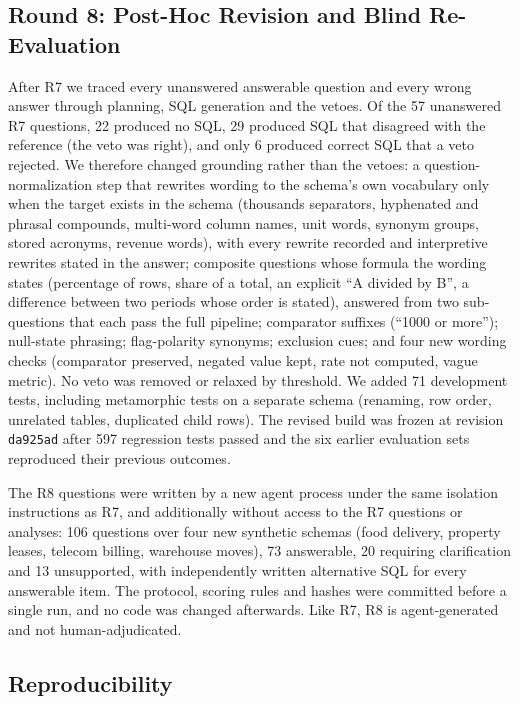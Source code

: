\documentclass[conference]{IEEEtran}
\begin{document}
\subsection{Round 8: Post-Hoc Revision and Blind Re-Evaluation}
\label{sec:r8method}

After R7 we traced every unanswered answerable question and every wrong answer through planning, SQL generation and the vetoes. Of the 57 unanswered R7 questions, 22 produced no SQL, 29 produced SQL that disagreed with the reference (the veto was right), and only 6 produced correct SQL that a veto rejected. We therefore changed grounding rather than the vetoes: a question-normalization step that rewrites wording to the schema's own vocabulary only when the target exists in the schema (thousands separators, hyphenated and phrasal compounds, multi-word column names, unit words, synonym groups, stored acronyms, revenue words), with every rewrite recorded and interpretive rewrites stated in the answer; composite questions whose formula the wording states (percentage of rows, share of a total, an explicit ``A divided by B'', a difference between two periods whose order is stated), answered from two sub-questions that each pass the full pipeline; comparator suffixes (``1000 or more''); null-state phrasing; flag-polarity synonyms; exclusion cues; and four new wording checks (comparator preserved, negated value kept, rate not computed, vague metric). No veto was removed or relaxed by threshold. We added 71 development tests, including metamorphic tests on a separate schema (renaming, row order, unrelated tables, duplicated child rows). The revised build was frozen at revision \texttt{da925ad} after 597 regression tests passed and the six earlier evaluation sets reproduced their previous outcomes.

The R8 questions were written by a new agent process under the same isolation instructions as R7, and additionally without access to the R7 questions or analyses: 106 questions over four new synthetic schemas (food delivery, property leases, telecom billing, warehouse moves), 73 answerable, 20 requiring clarification and 13 unsupported, with independently written alternative SQL for every answerable item. The protocol, scoring rules and hashes were committed before a single run, and no code was changed afterwards. Like R7, R8 is agent-generated and not human-adjudicated.

\subsection{Reproducibility}
\end{document}
